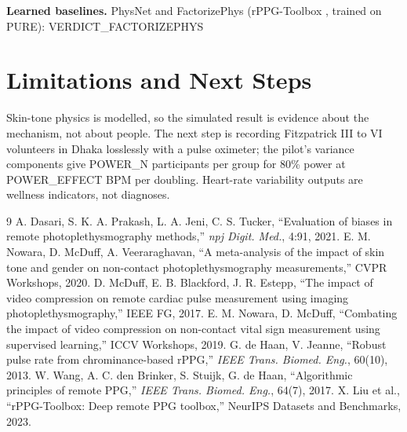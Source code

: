 \documentclass[conference]{IEEEtran}
\begin{document}
\textbf{Learned baselines.} PhysNet and FactorizePhys (rPPG-Toolbox \cite{liu2023}, trained on PURE): {{VERDICT_FACTORIZEPHYS}}

\section{Limitations and Next Steps}
Skin-tone physics is modelled, so the simulated result is evidence about the mechanism, not about people. The next step is recording Fitzpatrick III to VI volunteers in Dhaka losslessly with a pulse oximeter; the pilot's variance components give {{POWER_N}} participants per group for 80\% power at {{POWER_EFFECT}} BPM per doubling. Heart-rate variability outputs are wellness indicators, not diagnoses.

\begin{thebibliography}{9}
 A. Dasari, S. K. A. Prakash, L. A. Jeni, C. S. Tucker, ``Evaluation of biases in remote photoplethysmography methods,'' \emph{npj Digit. Med.}, 4:91, 2021.
 E. M. Nowara, D. McDuff, A. Veeraraghavan, ``A meta-analysis of the impact of skin tone and gender on non-contact photoplethysmography measurements,'' CVPR Workshops, 2020.
 D. McDuff, E. B. Blackford, J. R. Estepp, ``The impact of video compression on remote cardiac pulse measurement using imaging photoplethysmography,'' IEEE FG, 2017.
 E. M. Nowara, D. McDuff, ``Combating the impact of video compression on non-contact vital sign measurement using supervised learning,'' ICCV Workshops, 2019.
 G. de Haan, V. Jeanne, ``Robust pulse rate from chrominance-based rPPG,'' \emph{IEEE Trans. Biomed. Eng.}, 60(10), 2013.
 W. Wang, A. C. den Brinker, S. Stuijk, G. de Haan, ``Algorithmic principles of remote PPG,'' \emph{IEEE Trans. Biomed. Eng.}, 64(7), 2017.
 X. Liu et al., ``rPPG-Toolbox: Deep remote PPG toolbox,'' NeurIPS Datasets and Benchmarks, 2023.
\end{thebibliography}
\end{document}
